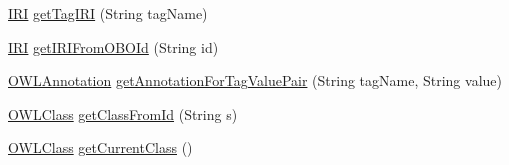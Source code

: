 \begin{DoxyCompactItemize}
\item 
\hyperlink{classorg_1_1semanticweb_1_1owlapi_1_1model_1_1_i_r_i}{I\-R\-I} \hyperlink{classorg_1_1coode_1_1owlapi_1_1obo_1_1parser_1_1_abstract_tag_value_handler_a562122aa74e80fd4fea4e795fafc7e48}{get\-Tag\-I\-R\-I} (String tag\-Name)
\item 
\hyperlink{classorg_1_1semanticweb_1_1owlapi_1_1model_1_1_i_r_i}{I\-R\-I} \hyperlink{classorg_1_1coode_1_1owlapi_1_1obo_1_1parser_1_1_abstract_tag_value_handler_a440e4b9582c945d1cc4bb28c34cc5f9f}{get\-I\-R\-I\-From\-O\-B\-O\-Id} (String id)
\item 
\hyperlink{interfaceorg_1_1semanticweb_1_1owlapi_1_1model_1_1_o_w_l_annotation}{O\-W\-L\-Annotation} \hyperlink{classorg_1_1coode_1_1owlapi_1_1obo_1_1parser_1_1_abstract_tag_value_handler_a4e94c76f1958df4cdbaca0ef6d9f1ac4}{get\-Annotation\-For\-Tag\-Value\-Pair} (String tag\-Name, String value)
\item 
\hyperlink{interfaceorg_1_1semanticweb_1_1owlapi_1_1model_1_1_o_w_l_class}{O\-W\-L\-Class} \hyperlink{classorg_1_1coode_1_1owlapi_1_1obo_1_1parser_1_1_abstract_tag_value_handler_a85100c5f7d03a55a237af903bcc49d09}{get\-Class\-From\-Id} (String s)
\item 
\hyperlink{interfaceorg_1_1semanticweb_1_1owlapi_1_1model_1_1_o_w_l_class}{O\-W\-L\-Class} \hyperlink{classorg_1_1coode_1_1owlapi_1_1obo_1_1parser_1_1_abstract_tag_value_handler_ad5f87562ea10cdfb30bd7124ecbde82a}{get\-Current\-Class} ()
\end{DoxyCompactItemize}
